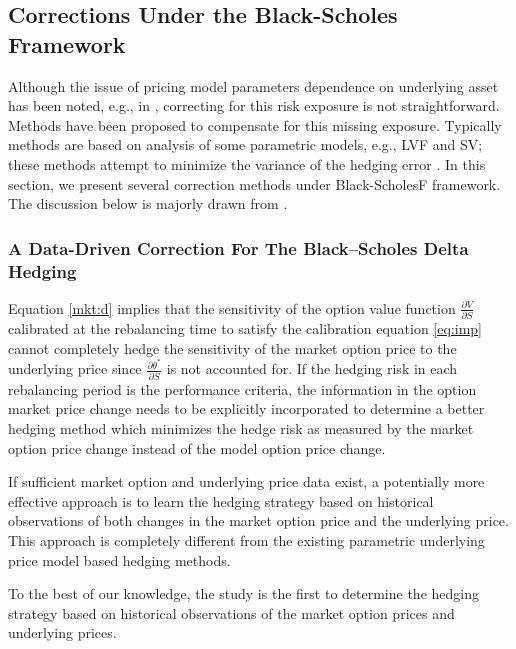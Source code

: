 \documentclass[letterpaper,12pt,titlepage,oneside,final]{book}
\numberwithin{equation}{section}
\theoremstyle{definition}
\begin{document}
\subsection{Corrections Under the Black-Scholes Framework}
Although the issue of pricing model parameters dependence on underlying asset has been noted, e.g., in \citep{coleman2001,hulloptimal}, correcting for this risk exposure is not straightforward.
Methods have been proposed to compensate for this missing exposure.  Typically methods are based on analysis of some parametric models, e.g., LVF and SV; these methods attempt to minimize the variance of the hedging error \citep{hulloptimal,alexander09,Angelini09,Angelini10,Goutte13}. In this section, we present several correction methods under Black-ScholesF framework. The discussion below is majorly drawn from \cite{hulloptimal,hagan2017bartlett,bartlett2006hedging}.
\subsubsection{A Data-Driven Correction For The Black–Scholes Delta Hedging}




Equation \eqref{mkt:d} implies that the sensitivity of the option value function $\frac{\partial V}{\partial S}$ calibrated at the rebalancing time to
satisfy the calibration equation \eqref{eq:imp} cannot completely hedge  
the sensitivity of the market option price to the underlying price since $\frac{\partial \theta^*}{\partial S}$ is not accounted for.
If the hedging risk in each rebalancing period is the performance criteria, the information in the option market price change needs to be explicitly incorporated to determine a better hedging method which minimizes the hedge risk as measured by the
market option price change instead of the model option price change.


If sufficient market option and underlying price data exist, a potentially more effective approach is to learn the hedging strategy 
based on historical observations of both  changes in the market option price and the underlying price. This approach is completely different from the existing  parametric underlying price
model based hedging methods.

To the best of our knowledge, the study
\cite{hulloptimal} is the first to determine the hedging strategy based on historical observations of the market option prices and 
underlying prices.  
\end{document}
